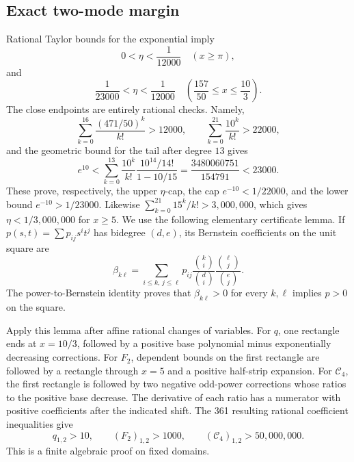 \documentclass[11pt]{article}
\theoremstyle{remark}
\newcommand{\Cfour}{\mathcal{C}_4}
\numberwithin{equation}{section}
\begin{document}
\subsection{Exact two-mode margin}

Rational Taylor bounds for the exponential imply
\[
 0<\eta<\frac1{12000}\quad(x\geq\pi),
\]
and
\[
 \frac1{23000}<\eta<\frac1{12000}
 \quad\left(\frac{157}{50}\leq x\leq\frac{10}{3}\right).
\]
The close endpoints are entirely rational checks. Namely,
\[
 \sum_{k=0}^{16}\frac{(471/50)^k}{k!}>12000,\qquad
 \sum_{k=0}^{21}\frac{10^k}{k!}>22000,
\]
and the geometric bound for the tail after degree \(13\) gives
\[
 e^{10}<
 \sum_{k=0}^{13}\frac{10^k}{k!}
 \frac{10^{14}/14!}{1-10/15}
 =\frac{3480060751}{154791}<23000.
\]
These prove, respectively, the upper \(\eta\)-cap, the cap
\(e^{-10}<1/22000\), and the lower bound \(e^{-10}>1/23000\).
Likewise \(\sum_{k=0}^{21}15^k/k!>3{,}000{,}000\), which gives
\(\eta<1/3{,}000{,}000\) for \(x\geq5\).
We use the following elementary certificate lemma. If
\(p(s,t)=\sum p_{ij}s^it^j\) has bidegree \((d,e)\), its Bernstein
coefficients on the unit square are
\[
 \beta_{k\ell}=\sum_{i\leq k,\,j\leq\ell}
 p_{ij}\frac{\binom{k}{i}}{\binom{d}{i}}
       \frac{\binom{\ell}{j}}{\binom{e}{j}}.
\]
The power-to-Bernstein identity proves that \(\beta_{k\ell}>0\) for every
\(k,\ell\) implies \(p>0\) on the square.

Apply this lemma after affine rational changes of variables. For \(q\), one
rectangle ends at \(x=10/3\), followed by a positive base polynomial minus
exponentially decreasing corrections. For \(F_2\), dependent bounds on the
first rectangle are followed by a rectangle through \(x=5\) and a positive
half-strip expansion. For \(\Cfour\), the first rectangle is followed by two
negative odd-power corrections whose ratios to the positive base decrease.
The derivative of each ratio has a numerator with positive coefficients after
the indicated shift. The 361 resulting rational coefficient inequalities give
\begin{equation}\label{eq:two-mode-margin}
 q_{1,2}>10,\qquad (F_2)_{1,2}>1000,\qquad
 (\Cfour)_{1,2}>50{,}000{,}000.
\end{equation}
This is a finite algebraic proof on fixed domains.
\end{document}
